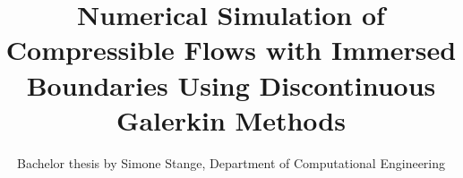 	\title{Numerical Simulation of Compressible Flows with Immersed Boundaries Using Discontinuous Galerkin Methods}
	\subtitle{Bachelor thesis by Simone Stange, Department of Computational Engineering}
	
